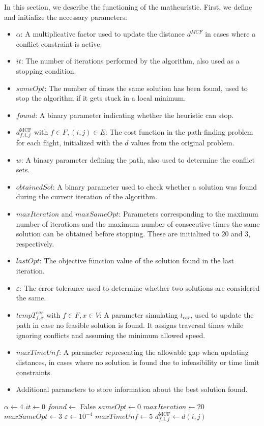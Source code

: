 \documentclass[../thesis.tex]{subfiles}
\begin{document}
In this section, we describe the functioning of the matheuristic.  
First, we define and initialize the necessary parameters:

\begin{itemize}
    \item $\alpha$: A multiplicative factor used to update the distance $d^{MCF}$ in cases where a conflict constraint is active.
    \item $it$: The number of iterations performed by the algorithm, also used as a stopping condition.
    \item $sameOpt$: The number of times the same solution has been found, used to stop the algorithm if it gets stuck in a local minimum.
    \item $found$: A binary parameter indicating whether the heuristic can stop.
    \item $d^\text{MCF}_{f,i,j}$ with $f\in F, (i,j)\in E$: The cost function in the path-finding problem for each flight, initialized with the $d$ values from the original problem.
    \item $w$: A binary parameter defining the path, also used to determine the conflict sets.
    \item $obtainedSol$: A binary parameter used to check whether a solution was found during the current iteration of the algorithm.
    \item $maxIteration$ and $maxSameOpt$: Parameters corresponding to the maximum number of iterations and the maximum number of consecutive times the same solution can be obtained before stopping. These are initialized to $20$ and $3$, respectively.
    \item $lastOpt$: The objective function value of the solution found in the last iteration.
    \item $\varepsilon$: The error tolerance used to determine whether two solutions are considered the same.
    \item $tempT^{ear}_{f,x}$ with $f\in F, x \in V$: A parameter simulating $t_{ear}$, used to update the path in case no feasible solution is found. It assigns traversal times while ignoring conflicts and assuming the minimum allowed speed.
    \item $maxTimeUnf$: A parameter representing the allowable gap when updating distances, in cases where no solution is found due to infeasibility or time limit constraints.
    \item Additional parameters to store information about the best solution found.
\end{itemize}
\begin{algorithm}[H]
\begin{algorithmic}
\STATE $\alpha\gets 4$
\STATE $it\gets 0$
\STATE $found\gets$ False
\STATE $sameOpt\gets 0$
\STATE $maxIteration\gets 20$
\STATE $maxSameOpt\gets 3$
\STATE $\varepsilon\gets 10^{-4}$
\STATE $maxTimeUnf\gets 5$
    \STATE $d^\text{MCF}_{f,i,j}\gets d(i,j)$
\ENDFOR

\end{algorithmic}
\end{algorithm}
\end{document}
